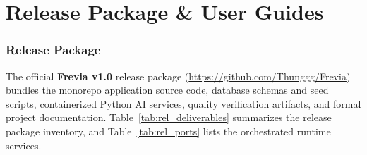 \newcommand{\wffig}[4][0.85]{\begin{figure}[H]\centering\screenshotframe[#1]{#2}\caption{#3}\label{#4}\end{figure}}

\part{Release Package \& User Guides}

\section{Release Package}

The official \textbf{Frevia v1.0} release package (\url{https://github.com/Thunggg/Frevia}) bundles the monorepo application source code, database schemas and seed scripts, containerized Python AI services, quality verification artifacts, and formal project documentation. Table~\ref{tab:rel_deliverables} summarizes the release package inventory, and Table~\ref{tab:rel_ports} lists the orchestrated runtime services.

